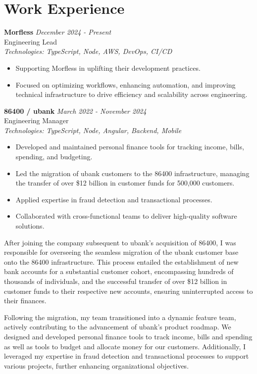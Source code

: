 \documentclass[a4paper,10pt]{article}
\begin{document}
\section*{Work Experience}

\textbf{Morfless} \hfill \textit{December 2024 - Present} \\
Engineering Lead \\
\textit{Technologies: TypeScript, Node, AWS, DevOps, CI/CD}
\begin{itemize}
    \item Supporting Morfless in uplifting their development practices.
    \item Focused on optimizing workflows, enhancing automation, and improving technical infrastructure to drive efficiency and scalability across engineering.
\end{itemize}

\textbf{86400 / ubank} \hfill \textit{March 2022 - November 2024} \\
Engineering Manager \\
\textit{Technologies: TypeScript, Node, Angular, Backend, Mobile}
\begin{itemize}
    \item Developed and maintained personal finance tools for tracking income, bills, spending, and budgeting.
    \item Led the migration of ubank customers to the 86400 infrastructure, managing the transfer of over \$12 billion in customer funds for 500,000 customers.
    \item Applied expertise in fraud detection and transactional processes.
    \item Collaborated with cross-functional teams to deliver high-quality software solutions.
\end{itemize}

After joining the company subsequent to ubank's acquisition of 86400, I was responsible for overseeing the seamless migration of the ubank customer base onto the 86400 infrastructure. This process entailed the establishment of new bank accounts for a substantial customer cohort, encompassing hundreds of thousands of individuals, and the successful transfer of over \$12 billion in customer funds to their respective new accounts, ensuring uninterrupted access to their finances.

Following the migration, my team transitioned into a dynamic feature team, actively contributing to the advancement of ubank's product roadmap. We designed and developed personal finance tools to track income, bills and spending as well as tools to budget and allocate money for our customers. Additionally, I leveraged my expertise in fraud detection and transactional processes to support various projects, further enhancing organizational objectives.
\end{document}
